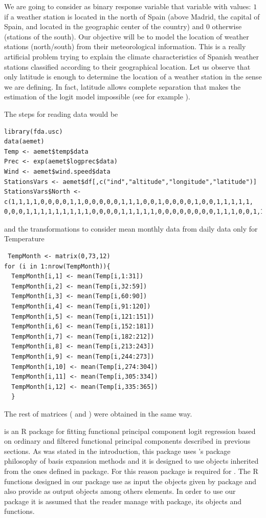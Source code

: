 We are going to consider as binary response variable that variable with values: $1$ if a weather station is located in the north of Spain (above Madrid, the capital of Spain, and located in the geographic center of the country) and $0$ otherwise (stations of the south). Our objective will be to model the location of weather stations (north/south) from their meteorological information. This is a really artificial problem trying to explain the climate characteristics of Spanish weather stations classified according to their geographical location. Let us observe that only latitude is enough to determine the location of a weather station in the sense we are defining. In fact, latitude allows complete separation that makes the estimation of the logit model impossible (see for example \citealp{Hosmer13}).

The steps for reading data would be

\begin{verbatim}
library(fda.usc)
data(aemet)
Temp <- aemet$temp$data
Prec <- exp(aemet$logprec$data)
Wind <- aemet$wind.speed$data
StationsVars <- aemet$df[,c("ind","altitude","longitude","latitude")]
StationsVars$North <- c(1,1,1,1,0,0,0,0,1,1,0,0,0,0,0,1,1,1,0,0,1,0,0,0,0,1,0,0,1,1,1,1,1,
0,0,0,1,1,1,1,1,1,1,1,1,0,0,0,0,1,1,1,1,1,0,0,0,0,0,0,0,0,1,1,1,0,0,1,1,1,1,1,1)
\end{verbatim}

\noindent and the transformations to consider mean monthly data from daily data only for Temperature

\begin{verbatim}
 TempMonth <- matrix(0,73,12)
for (i in 1:nrow(TempMonth)){
  TempMonth[i,1] <- mean(Temp[i,1:31])
  TempMonth[i,2] <- mean(Temp[i,32:59])
  TempMonth[i,3] <- mean(Temp[i,60:90])
  TempMonth[i,4] <- mean(Temp[i,91:120])
  TempMonth[i,5] <- mean(Temp[i,121:151])
  TempMonth[i,6] <- mean(Temp[i,152:181])
  TempMonth[i,7] <- mean(Temp[i,182:212])
  TempMonth[i,8] <- mean(Temp[i,213:243])
  TempMonth[i,9] <- mean(Temp[i,244:273])
  TempMonth[i,10] <- mean(Temp[i,274:304])
  TempMonth[i,11] <- mean(Temp[i,305:334])
  TempMonth[i,12] <- mean(Temp[i,335:365])
  }
\end{verbatim}

The rest of matrices ( and ) were obtained in the same way.

 is an R package for fitting functional principal component logit regression based on ordinary and filtered functional principal components described in previous sections. As was stated in the introduction, this package uses 's package philosophy of basis expansion methods and it is designed to use objects inherited from the ones defined in  package. For this reason  package is required for . The R functions designed in our package use as input the  objects given by  package and also provide as output  objects among others elements. In order to use our package it is assumed that the reader manage with  package, its objects and functions. 

